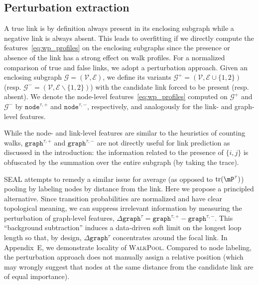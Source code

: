 \documentclass[11pt]{article}
\newcommand{\walkpool}{\textsc{WalkPool}\xspace}
\begin{document}
\subsection{Perturbation extraction}
\vspace{-1mm}
A true link is by definition always present in its enclosing subgraph while a negative link is always absent. This leads to overfitting if we directly compute the features~\eqref{eq:wp_profiles} on the enclosing subgraphs since the presence or absence of the link has a strong effect on walk profiles.
For a normalized comparison of true and false links, we adopt a perturbation approach. Given an enclosing subgraph $\mathcal{G} = (\mathcal{V}, \mathcal{E})$, we define its variants $\mathcal{G}^{+} = (\mathcal{V}, \mathcal{E} \cup \{1, 2\})$ (resp. $\mathcal{G}^{-} = (\mathcal{V}, \mathcal{E} \backslash \{1, 2\})$) with the candidate link forced to be present (resp. absent). We denote the node-level features~\eqref{eq:wp_profiles} computed on $\mathcal{G}^{+}$  and $\mathcal{G}^{-}$ by $\mathtt{node}^{\tau,+}$ and $\mathtt{node}^{\tau,-}$, respectively, and analogously for the link- and graph-level features.

While the node- and link-level features are similar to the heuristics of counting walks, $\mathtt{graph}^{\tau,+}$ and $\mathtt{graph}^{\tau,-}$ are not directly useful for link prediction as discussed in the introduction: the information related to the presence of $\{i, j\}$ is obfuscated by the summation over the entire subgraph (by taking the trace). 



SEAL attempts to remedy a similar issue for average (as opposed to $\mathrm{tr}(\mP^\tau)$) pooling by labeling nodes by distance from the link. Here we propose a principled alternative. Since transition probabilities are normalized and have clear topological meaning, we can suppress irrelevant information by measuring the perturbation of graph-level features,
$
    \Delta \mathtt{graph}^{\tau} = \mathtt{graph}^{\tau,+}- \mathtt{graph}^{\tau,-}.
$
This ``background subtraction'' induces a data-driven soft limit on the longest loop length so that, by design, $\Delta \mathtt{graph}^\tau$  concentrates around the focal link. In Appendix~E, we demonstrate locality of \walkpool. Compared to node labeling, the perturbation approach does not manually assign a relative position (which may wrongly suggest that nodes at the same distance from the candidate link are of equal importance).
\end{document}
